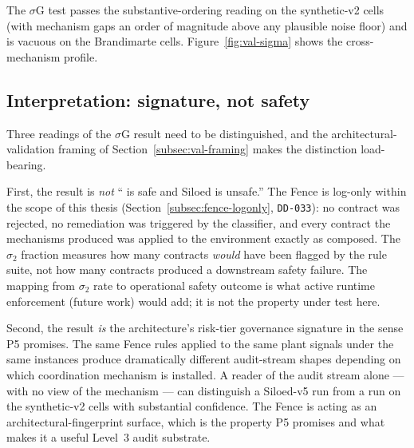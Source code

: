 The $\sigma$G test passes the substantive-ordering reading on the
synthetic-v2 cells (with mechanism gaps an order of magnitude above
any plausible noise floor) and is vacuous on the Brandimarte cells.
Figure~\ref{fig:val-sigma} shows the cross-mechanism profile.


\subsection*{Interpretation: signature, not safety}

Three readings of the $\sigma$G result need to be distinguished, and
the architectural-validation framing of Section~\ref{subsec:val-framing}
makes the distinction load-bearing.

First, the result is \emph{not} ``\NEXUS{} is safe and Siloed is
unsafe.'' The Fence is log-only within the scope of this thesis
(Section~\ref{subsec:fence-logonly}, \texttt{DD-033}): no contract
was rejected, no remediation was triggered by the classifier, and
every contract the mechanisms produced was applied to the
environment exactly as composed. The $\sigma_2$ fraction measures
how many contracts \emph{would} have been flagged by the rule suite,
not how many contracts produced a downstream safety failure. The
mapping from $\sigma_2$ rate to operational safety outcome is what
active runtime enforcement (future work) would add; it is not the
property under test here.

Second, the result \emph{is} the architecture's risk-tier governance
signature in the sense P5 promises. The same Fence rules applied to
the same plant signals under the same instances produce dramatically
different audit-stream shapes depending on which coordination
mechanism is installed. A reader of the audit stream alone --- with
no view of the mechanism --- can distinguish a Siloed-v5 run from a
\NEXUS{} run on the synthetic-v2 cells with substantial confidence.
The Fence is acting as an architectural-fingerprint surface, which is
the property P5 promises and what makes it a useful Level~3 audit
substrate.


